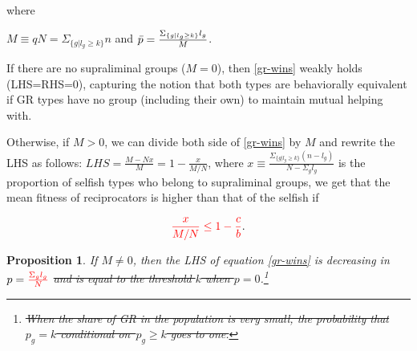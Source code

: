 \documentclass[12pt,a4paper]{article}
\newtheorem{prop}[theo]{Proposition}
\newcommand{\mm}[1]{{\color{red} #1}}
\begin{document}
where \mm{$M \equiv qN=\Sigma_{\{g|l_g \geq k\}}n$ and $\bar{p} = \frac{\Sigma_{\{g|l_g \geq k\}}l_g}{M}$.


\vspace{0.2cm}
If there are no supraliminal groups ($M=0$), then \eqref{gr-wins} weakly holds (LHS=RHS=0), capturing the notion that both types are behaviorally equivalent if GR types have no group (including their own) to maintain mutual helping with.

Otherwise, if $M>0$, we can divide both side of \eqref{gr-wins} by $M$ and rewrite the LHS as follows: $LHS=\frac{M-Nx}{M}=1-\frac{x}{M/N}$, where $x \equiv \frac{\Sigma_{\{g|l_g \geq k\}}(n-l_g)}{N-\Sigma_gl_g}$ is the proportion of selfish types who belong to supraliminal groups, we get that the mean fitness of reciprocators is higher than that of the selfish if
}

\begin{equation}
\label{gr-wins-2}
\mm{\frac{x}{M/N} \le 1-\frac{c}{b}}.
\end{equation}

\begin{prop}
\label{prop:decrease_in_p}
    \mm{If $M \neq 0$, then} the LHS of equation \eqref{gr-wins} is decreasing in $p=\mm{\frac{\Sigma_gl_g}{N}}$ \sout{and is equal
to the threshold $k$ when $p = 0$}.\footnote{\sout{
    When the share of GR in the population is very small, the probability that $p_g = k$ conditional on~$p_g\geq k$ goes to one.
}}
\end{prop}
\end{document}

